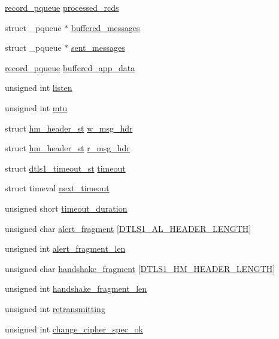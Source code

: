 \begin{DoxyCompactItemize}
\item 
\hyperlink{dtls1_8h_aac9fce3ec0c12051ecb4de0e531747f8}{record\+\_\+pqueue} \hyperlink{structdtls1__state__st_ac7496a32427c880c57cad29cf624983b}{processed\+\_\+rcds}
\item 
struct \+\_\+pqueue $\ast$ \hyperlink{structdtls1__state__st_a67e7d964f1ea8e37fc12ab89f623d28f}{buffered\+\_\+messages}
\item 
struct \+\_\+pqueue $\ast$ \hyperlink{structdtls1__state__st_af6ab57de288de98288a13ae449128084}{sent\+\_\+messages}
\item 
\hyperlink{dtls1_8h_aac9fce3ec0c12051ecb4de0e531747f8}{record\+\_\+pqueue} \hyperlink{structdtls1__state__st_a00969b1c93b0b229fbb98a4aabe9cd01}{buffered\+\_\+app\+\_\+data}
\item 
unsigned int \hyperlink{structdtls1__state__st_a834e8572b18cebed829621b26f629715}{listen}
\item 
unsigned int \hyperlink{structdtls1__state__st_a0518fb297c24c3b28e9ee3122be2967a}{mtu}
\item 
struct \hyperlink{structhm__header__st}{hm\+\_\+header\+\_\+st} \hyperlink{structdtls1__state__st_aa16e59d7f125177caa2b5939fcb13890}{w\+\_\+msg\+\_\+hdr}
\item 
struct \hyperlink{structhm__header__st}{hm\+\_\+header\+\_\+st} \hyperlink{structdtls1__state__st_a1c6a7daa242306285d142a607d0a63b1}{r\+\_\+msg\+\_\+hdr}
\item 
struct \hyperlink{structdtls1__timeout__st}{dtls1\+\_\+timeout\+\_\+st} \hyperlink{structdtls1__state__st_af619339c285b02986b695f6d505f1c36}{timeout}
\item 
struct timeval \hyperlink{structdtls1__state__st_a499a60c3bed45a4de6da508430035578}{next\+\_\+timeout}
\item 
unsigned short \hyperlink{structdtls1__state__st_ad5deca28499d48a4faa5fae12f621d93}{timeout\+\_\+duration}
\item 
unsigned char \hyperlink{structdtls1__state__st_a7fc037708d5e02c3b7e401aa06bf8df9}{alert\+\_\+fragment} \mbox{[}\hyperlink{dtls1_8h_a0b67a04e169539f32cbc3c4951f4340a}{D\+T\+L\+S1\+\_\+\+A\+L\+\_\+\+H\+E\+A\+D\+E\+R\+\_\+\+L\+E\+N\+G\+TH}\mbox{]}
\item 
unsigned int \hyperlink{structdtls1__state__st_afc29db2cfa1741bc83934534a82c9c99}{alert\+\_\+fragment\+\_\+len}
\item 
unsigned char \hyperlink{structdtls1__state__st_a1fca455e80d0a3036c79d9209ac51633}{handshake\+\_\+fragment} \mbox{[}\hyperlink{dtls1_8h_a313ba59cb24cf778204cfff800bebc4c}{D\+T\+L\+S1\+\_\+\+H\+M\+\_\+\+H\+E\+A\+D\+E\+R\+\_\+\+L\+E\+N\+G\+TH}\mbox{]}
\item 
unsigned int \hyperlink{structdtls1__state__st_abeb5303866e89417b37551332cf28f08}{handshake\+\_\+fragment\+\_\+len}
\item 
unsigned int \hyperlink{structdtls1__state__st_a55559920472b96c76fbe4b1bf83c62e5}{retransmitting}
\item 
unsigned int \hyperlink{structdtls1__state__st_a1d0bfd86d37d9058a404a119b2f68ee9}{change\+\_\+cipher\+\_\+spec\+\_\+ok}
\end{DoxyCompactItemize}


